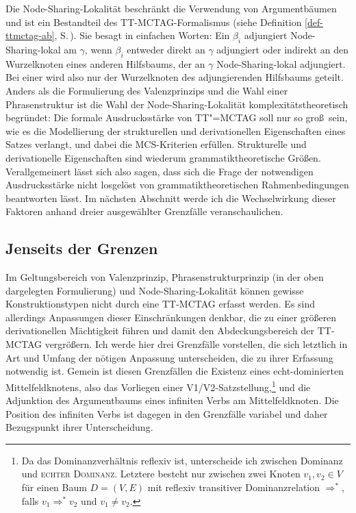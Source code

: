Die Node-Sharing-Lokalität beschränkt die Verwendung von Argumentbäumen und ist ein Bestandteil des TT-MCTAG-Formalismus (siehe Definition \ref{def-ttmctag-ab}, S.\,\pageref{def-ttmctag-ab}). Sie besagt in einfachen Worten: Ein  $\beta_i$ adjungiert Node-Sharing-lokal am  $\gamma$, wenn $\beta_i$ entweder direkt an $\gamma$ adjungiert oder indirekt an den Wurzelknoten eines anderen Hilfsbaums, der an $\gamma$ Node-Sharing-lokal adjungiert. Bei einer  wird also nur der Wurzelknoten des adjungierenden Hilfsbaums geteilt.  
%
Anders als die Formulierung des Valenzprinzips und die Wahl einer Phrasenstruktur ist die Wahl der Node-Sharing-Lokalität komplexitätstheoretisch begründet: Die formale Ausdrucksstärke von TT"=MCTAG soll nur so gro\ss\ sein, wie es die Modellierung der strukturellen und derivationellen Eigenschaften eines Satzes verlangt, und dabei die MCS-Kriterien erfüllen. Strukturelle und derivationelle Eigenschaften sind wiederum grammatiktheoretische Grö\ss en. Verallgemeinert lässt sich also sagen, dass sich die Frage der notwendigen Ausdrucksstärke nicht losgelöst von grammatiktheoretischen Rahmenbedingungen beantworten lässt. Im nächsten Abschnitt werde ich die Wechselwirkung dieser Faktoren anhand dreier ausgewählter Grenzfälle veranschaulichen. 


\subsection{Jenseits der Grenzen}

Im Geltungsbereich von Valenzprinzip, Phrasenstrukturprinzip (in der oben dargelegten Formulierung) und Node-Sharing-Lokalität können gewisse Konstruktionstypen nicht durch eine TT-MCTAG erfasst werden. Es sind allerdings Anpassungen dieser Einschränkungen denkbar, die zu einer größeren derivationellen Mächtigkeit führen und damit den Abdeckungsbereich der TT-MCTAG vergrößern. Ich werde hier drei Grenzfälle vorstellen, die sich letztlich in Art und Umfang der nötigen Anpassung unterscheiden, die zu ihrer Erfassung notwendig ist. 
%
Gemein ist diesen Grenzfällen die Existenz eines echt-dominierten Mittelfeldknotens, also das Vorliegen einer V1/V2-Satzstellung,\footnote{Da das Dominanzverhältnis reflexiv ist, unterscheide ich zwischen Dominanz und \textsc{echter Dominanz}. Letztere besteht nur zwischen zwei Knoten $v_1, v_2 \in V$ für einen Baum $D = (V,E)$ mit reflexiv transitiver Dominanzrelation $\Rightarrow^*$, falls $v_1 \Rightarrow^* v_2$ und $v_1 \neq v_2$.} und die Adjunktion des Argumentbaums eines infiniten Verbs am Mittelfeldknoten. Die Position des infiniten Verbs ist dagegen in den Grenzfälle variabel und daher Bezugspunkt ihrer Unterscheidung. 


